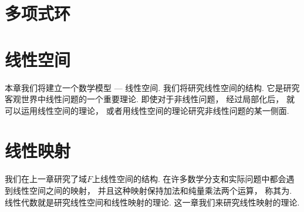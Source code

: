 \chapter{多项式环}













\chapter{线性空间}
本章我们将建立一个数学模型 --- 线性空间.
我们将研究线性空间的结构.
它是研究客观世界中线性问题的一个重要理论.
即使对于非线性问题，
经过局部化后，
就可以运用线性空间的理论，
或者用线性空间的理论研究非线性问题的某一侧面.






\chapter{线性映射}
我们在上一章研究了域\(F\)上线性空间的结构.
在许多数学分支和实际问题中都会遇到线性空间之间的映射，
并且这种映射保持加法和纯量乘法两个运算，
称其为.
线性代数就是研究线性空间和线性映射的理论.
这一章我们来研究线性映射的理论.











